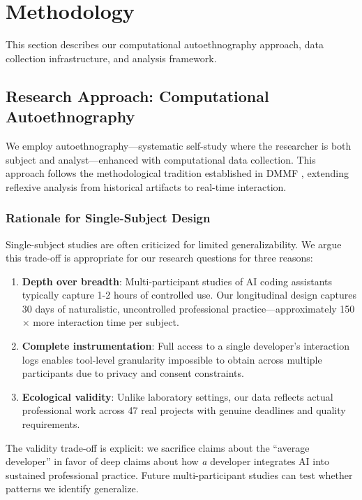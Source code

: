 
\section{Methodology}

This section describes our computational autoethnography approach, data collection infrastructure, and analysis framework.

\subsection{Research Approach: Computational Autoethnography}

We employ autoethnography---systematic self-study where the researcher is both subject and analyst---enhanced with computational data collection. This approach follows the methodological tradition established in DMMF \cite{silva2025dmmf}, extending reflexive analysis from historical artifacts to real-time interaction.

\subsubsection{Rationale for Single-Subject Design}

Single-subject studies are often criticized for limited generalizability. We argue this trade-off is appropriate for our research questions for three reasons:

\begin{enumerate}
    \item \textbf{Depth over breadth}: Multi-participant studies of AI coding assistants typically capture 1-2 hours of controlled use. Our longitudinal design captures 30 days of naturalistic, uncontrolled professional practice---approximately 150$\times$ more interaction time per subject.

    \item \textbf{Complete instrumentation}: Full access to a single developer's interaction logs enables tool-level granularity impossible to obtain across multiple participants due to privacy and consent constraints.

    \item \textbf{Ecological validity}: Unlike laboratory settings, our data reflects actual professional work across 47 real projects with genuine deadlines and quality requirements.
\end{enumerate}

The validity trade-off is explicit: we sacrifice claims about the ``average developer'' in favor of deep claims about how \textit{a} developer integrates AI into sustained professional practice. Future multi-participant studies can test whether patterns we identify generalize.


